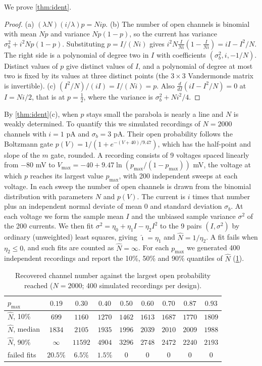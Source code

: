 \documentclass[11pt]{article}
\theoremstyle{definition}\newtheorem{definition}[theorem]{Definition}
\theoremstyle{remark}\newtheorem{remark}[theorem]{Remark}
\begin{document}
We prove \cref{thm:ident}.
\begin{proof}
(a) $(\lambda N)(i/\lambda)p=Nip$. (b) The number of open channels is binomial with mean $Np$ and variance $Np(1-p)$, so the current has variance $\sigma_b^2+i^2Np(1-p)$. Substituting $p=I/(Ni)$ gives $i^2N\frac{I}{Ni}(1-\frac{I}{Ni})=iI-I^2/N$. The right side is a polynomial of degree two in $I$ with coefficients $(\sigma_b^2,i,-1/N)$. Distinct values of $p$ give distinct values of $I$, and a polynomial of degree at most two is fixed by its values at three distinct points (the $3\times3$ Vandermonde matrix is invertible). (c) $(I^2/N)/(iI)=I/(Ni)=p$. Also $\frac{d}{dI}(iI-I^2/N)=0$ at $I=Ni/2$, that is at $p=\frac12$, where the variance is $\sigma_b^2+Ni^2/4$.
\end{proof}

By \cref{thm:ident}(c), when $p$ stays small the parabola is nearly a line and $N$ is weakly determined. To quantify this we simulated recordings of $N=2000$ channels with $i=1$ pA and $\sigma_b=3$ pA. Their open probability follows the Boltzmann gate $p(V)=1/(1+e^{-(V+40)/9.47})$, which has the half-point and slope of the $m$ gate, rounded. A recording consists of 9 voltages spaced linearly from $-80$ mV to $V_{\max}=-40+9.47\ln(p_{\max}/(1-p_{\max}))$ mV, the voltage at which $p$ reaches its largest value $p_{\max}$, with 200 independent sweeps at each voltage. In each sweep the number of open channels is drawn from the binomial distribution with parameters $N$ and $p(V)$. The current is $i$ times that number plus an independent normal deviate of mean $0$ and standard deviation $\sigma_b$. At each voltage we form the sample mean $I$ and the unbiased sample variance $\sigma^2$ of the 200 currents. We then fit $\sigma^2=\eta_0+\eta_1I-\eta_2I^2$ to the 9 pairs $(I,\sigma^2)$ by ordinary (unweighted) least squares, giving $\hat\imath=\eta_1$ and $\hat N=1/\eta_2$. A fit fails when $\eta_2\le0$, and such fits are counted as $\hat N=\infty$. For each $p_{\max}$ we generated 400 independent recordings and report the 10\%, 50\% and 90\% quantiles of $\hat N$ (\cref{tab:count}).

\begin{table}[htbp]\centering\small
\caption{Recovered channel number against the largest open probability reached ($N=2000$; 400 simulated recordings per design).}\label{tab:count}
\begin{tabular}{@{}lcccccccc@{}}\toprule
$p_{\max}$ & $0.19$ & $0.30$ & $0.40$ & $0.50$ & $0.60$ & $0.70$ & $0.87$ & $0.93$\\\midrule
$\hat N$, 10\% & $699$ & $1160$ & $1270$ & $1462$ & $1613$ & $1687$ & $1770$ & $1809$\\
$\hat N$, median & $1834$ & $2105$ & $1935$ & $1996$ & $2039$ & $2010$ & $2009$ & $1988$\\
$\hat N$, 90\% & $\infty$ & $11592$ & $4904$ & $3296$ & $2748$ & $2472$ & $2240$ & $2193$\\
failed fits & $20.5\%$ & $6.5\%$ & $1.5\%$ & $0$ & $0$ & $0$ & $0$ & $0$\\\bottomrule
\end{tabular}
\end{table}
\end{document}

